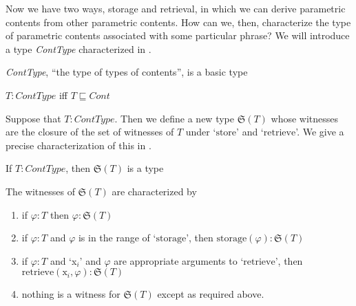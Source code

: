 Now we have two ways, storage and retrieval, in which we can derive parametric contents from
other parametric contents.  How can we, then, characterize the type of
parametric contents associated with some particular phrase?  We will introduce a type \textit{ContType}
characterized in \nexteg{}.
\begin{ex} 
\begin{subex} 
 
\item \textit{ContType}, ``the type of types of contents'', is a basic type 
 
\item $T:\textit{ContType}$ iff $T\sqsubseteq\textit{Cont}$ 
 
\end{subex} 
   
\end{ex}
Suppose
that $T:\textit{ContType}$.  Then we define a new type
$\mathfrak{S}(T)$ whose witnesses are the closure of the set of
witnesses of $T$ under `$\mathrm{store}$' and `$\mathrm{retrieve}$'.
We give a precise characterization of this in \nexteg{}.
\begin{ex} 
\begin{subex} 
 
\item If $T:\textit{ContType}$, then $\mathfrak{S}(T)$ is a type 
 
\item The witnesses of $\mathfrak{S}(T)$ are characterized by
  \begin{enumerate} 
 
  \item if $\varphi:T$ then $\varphi:\mathfrak{S}(T)$ 
 
  \item if $\varphi:T$ and $\varphi$ is in the range of `$\mathrm{storage}$', then
    $\mathrm{storage}(\varphi):\mathfrak{S}(T)$

  \item if $\varphi:T$ and `x$_i$' and $\varphi$ are appropriate
    arguments to `$\mathrm{retrieve}$', then
    $\mathrm{retrieve}(\text{x}_i,\varphi):\mathfrak{S}(T)$
    
  \item nothing is a witness for $\mathfrak{S}(T)$ except as required above.
 
  \end{enumerate} 
  
 
\end{subex} 
\label{ex:storage-type}   
\end{ex}


